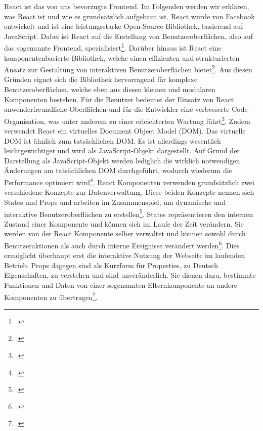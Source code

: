 React ist das von uns bevorzugte Frontend. Im Folgenden werden wir erklären, was React ist und wie es grundsätzlich aufgebaut ist.
React wurde von Facebook entwickelt und ist eine leistungsstarke Open-Source-Bibliothek, basierend auf JavaScript. Dabei ist React auf die Erstellung von Benutzeroberflächen, also auf das sogenannte Frontend, spezialisiert\footcite{acharya_15_2023}. Darüber hinaus ist React eine komponentenbasierte Bibliothek, welche einen effizienten und strukturierten Ansatz zur Gestaltung von interaktiven Benutzeroberflächen bietet\footcite{p_was_2024}. 
Aus diesen Gründen eignet sich die Bibliothek hervorragend für komplexe Benutzeroberflächen, welche eben aus diesen kleinen und modularen Komponenten bestehen. Für die Benutzer bedeutet der Einsatz von React anwenderfreundliche Oberflächen und für die Entwickler eine verbesserte Code-Organisation, was unter anderem zu einer erleichterten Wartung führt\footcite{autor_komponentenbasierte_nodate}.
Zudem verwendet React ein virtuelles Document Object Model (DOM). Das virtuelle DOM ist ähnlich zum tatsächlichen DOM. Es ist allerdings wesentlich leichtgewichtiger und wird als JavaScript-Objekt dargestellt. Auf Grund der Darstellung als JavaScript-Objekt werden lediglich die wirklich notwendigen Änderungen am tatsächlichen DOM durchgeführt, wodurch wiederum die Performance optimiert wird\footcite{autor_mastering_2023}.
React Komponenten verwenden grundsätzlich zwei verschiedene Konzepte zur Datenverwaltung. Diese beiden Konzepte nennen sich States und Props und arbeiten im Zusammenspiel, um dynamische und interaktive Benutzeroberflächen zu erstellen\footcite{autor_react_nodate}.
States repräsentieren den internen Zustand einer Komponente und können sich im Laufe der Zeit verändern. Sie werden von der React Komponente selber verwaltet und können sowohl durch Benutzeraktionen als auch durch interne Ereignisse verändert werden\footcite{autor_state_nodate-1}. Dies ermöglicht überhaupt erst die interaktive Nutzung der Webseite im laufenden Betrieb.
Props dagegen sind als Kurzform für Properties, zu Deutsch Eigenschaften, zu verstehen und sind unveränderlich. Sie dienen dazu, bestimmte Funktionen und Daten von einer sogenannten Elternkomponente an andere Komponenten zu übertragen\footcite{autor_state_nodate}.